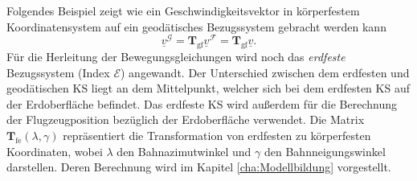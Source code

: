 Folgendes Beispiel zeigt wie ein Geschwindigkeitsvektor in körperfestem Koordinatensystem auf ein geodätisches Bezugssystem gebracht werden kann\\
\begin{equation*}
\underline{v}^\mathcal{G} = \textbf{T}_\mathrm{gf}\underline{v}^\mathcal{F} = \textbf{T}_\mathrm{gf}\underline{v}.
\end{equation*}
Für die Herleitung der Bewegungsgleichungen wird noch das \textit{erdfeste} Bezugssystem (Index $\mathcal{E}$) angewandt. Der Unterschied zwischen dem erdfesten und geodätischen KS liegt an dem Mittelpunkt, welcher sich bei dem erdfesten KS  auf der Erdoberfläche befindet. Das erdfeste KS wird außerdem für die Berechnung der Flugzeugposition bezüglich der Erdoberfläche verwendet. Die Matrix $\textbf{T}_\mathrm{fe}(\lambda,\gamma) $ repräsentiert die Transformation von erdfesten zu körperfesten Koordinaten, wobei $\lambda$ den Bahnazimutwinkel und $\gamma$ den Bahnneigungswinkel darstellen. Deren Berechnung wird im Kapitel \ref{cha:Modellbildung} vorgestellt.